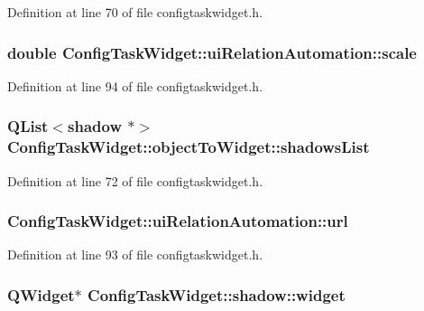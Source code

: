 \-Definition at line 70 of file configtaskwidget.\-h.

\hypertarget{group___u_a_v_object_widget_utils_gafddb00770c074c3ce12d1699813a4d30}{
\subsubsection[{scale}]{\setlength{\rightskip}{0pt plus 5cm}double {\bf \-Config\-Task\-Widget\-::ui\-Relation\-Automation\-::scale}}}\label{group___u_a_v_object_widget_utils_gafddb00770c074c3ce12d1699813a4d30}


\-Definition at line 94 of file configtaskwidget.\-h.

\hypertarget{group___u_a_v_object_widget_utils_ga720684f6824db0612bacf1e3769c4ef3}{
\subsubsection[{shadows\-List}]{\setlength{\rightskip}{0pt plus 5cm}\-Q\-List$<$shadow $\ast$$>$ {\bf \-Config\-Task\-Widget\-::object\-To\-Widget\-::shadows\-List}}}\label{group___u_a_v_object_widget_utils_ga720684f6824db0612bacf1e3769c4ef3}


\-Definition at line 72 of file configtaskwidget.\-h.

\hypertarget{group___u_a_v_object_widget_utils_ga14b83b3a1113a21d03ee1b3e8967b7e7}{
\subsubsection[{url}]{ {\bf \-Config\-Task\-Widget\-::ui\-Relation\-Automation\-::url}}}\label{group___u_a_v_object_widget_utils_ga14b83b3a1113a21d03ee1b3e8967b7e7}


\-Definition at line 93 of file configtaskwidget.\-h.

\hypertarget{group___u_a_v_object_widget_utils_ga06fc48ad3875446139f13fbb5b85cdcf}{
\subsubsection[{widget}]{\setlength{\rightskip}{0pt plus 5cm}\-Q\-Widget$\ast$ {\bf \-Config\-Task\-Widget\-::shadow\-::widget}}}\label{group___u_a_v_object_widget_utils_ga06fc48ad3875446139f13fbb5b85cdcf}


